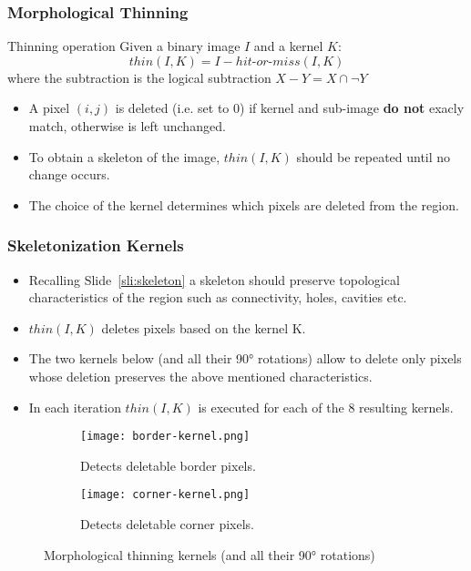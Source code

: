 \begin{frame}[c]
  \frametitle{Morphological Thinning}
  \begin{block}
    {Thinning operation}
    Given a binary image $I$ and a kernel $K$:
    \begin{equation}
      thin(I, K) = I - hit\mbox{-}or\mbox{-}miss(I, K)
    \end{equation}
    where the subtraction is the logical subtraction $X-Y = X \cap \neg Y$
  \end{block}
  \begin{itemize}
    \item A pixel $(i, j)$ is deleted (i.e. set to 0) if kernel and sub-image \textbf{do not} exacly match, otherwise is left unchanged.
    \item To obtain a skeleton of the image, $thin(I, K)$ should be repeated until no change occurs.
    \item The choice of the kernel determines which pixels are deleted from the region.
  \end{itemize}
\end{frame}

\begin{frame}
  \frametitle{Skeletonization Kernels}
  \begin{itemize}
    \item Recalling Slide~\ref{sli:skeleton} a skeleton should preserve topological characteristics of the region such as connectivity, holes, cavities etc.
    \item $thin(I, K)$ deletes pixels based on the kernel K.
    \item The two kernels below (and all their 90° rotations) allow to delete only pixels whose deletion preserves the above mentioned characteristics.
    \item In each iteration $thin(I, K)$ is executed for each of the 8 resulting kernels.
  \end{itemize}
  \begin{figure}
    \centering
    \begin{subfigure}[b]{0.45\textwidth}
      \centering
      \texttt{[image: border-kernel.png]}
      \caption{Detects deletable border pixels.}
    \end{subfigure}
    \hfill
    \begin{subfigure}[b]{0.45\textwidth}
      \centering
      \texttt{[image: corner-kernel.png]}
      \caption{Detects deletable corner pixels.}
    \end{subfigure}
    \caption{Morphological thinning kernels (and all their 90° rotations)}
  \end{figure}
\end{frame}

